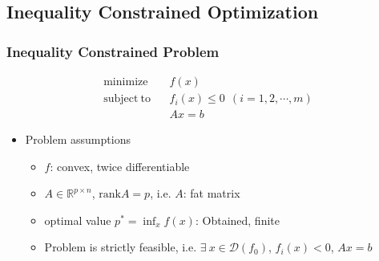 \subsection{Inequality Constrained Optimization}

\subsubsection*{Inequality Constrained Problem}
\begin{equation}\begin{aligned}
    \mathrm{minimize}~~&~~f(x) \\
    \mathrm{subject~to}~~&~~f_i(x)\leq 0~~(i=1,2,\cdots,m) \\
        &~~Ax=b
\end{aligned}\end{equation}
\begin{itemize}
    \item Problem assumptions
    \begin{itemize}
        \item $f$: convex, twice differentiable
        \item $A\in\mathbb{R}^{p\times n}$, $\mathrm{rank}A=p$, i.e. $A$: fat matrix
        \item optimal value $p^\ast = \inf_x f(x)$: Obtained, finite
        \item Problem is strictly feasible, i.e. $\exists~x\in\mathcal{D}(f_0)$, $f_i(x)<0$, $Ax=b$
    \end{itemize}
\end{itemize}

